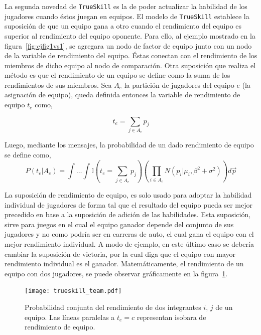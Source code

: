 \documentclass[11pt,twoside,spanish]{report} %
\begin{document}
La segunda novedad de \texttt{TrueSkill} es la de poder actualizar la habilidad de los jugadores cuando \'estos juegan en equipos.
El modelo de \texttt{TrueSkill} establece la suposici\'on de que un equipo gana a otro cuando el rendimiento del equipo es superior al rendimiento del equipo oponente.
Para ello, al ejemplo mostrado en la figura~\ref{fig:ejfig1vs1}, se agregara un nodo de factor de equipo junto con un nodo de la variable de rendimiento del equipo.
\'Estas conectan con el rendimiento de los miembros de dicho equipo al nodo de comparaci\'on.
Otra suposici\'on que realiza el m\'etodo es que el rendimiento de un equipo se define como la suma de los rendimientos de sus miembros.
Sea $A_e$ la partici\'on de jugadores del equipo $e$ (la asignaci\'on de equipo), queda definida entonces la variable de rendimiento de equipo $t_e$ como,

\begin{equation}
t_e = \sum_{j\in A_e } p_j
\end{equation}

Luego, mediante los mensajes, la probabilidad de un dado rendimiento de equipo se define como,
\begin{equation}
P(t_e|A_e) = \int \dots \int \mathbb{I}(t_e = \sum_{j\in A_e } p_j ) \left(\prod_{i \in A_e} N(p_i|\mu_i,\beta^2 + \sigma^2) \right) d\vec{p}
\end{equation}

La suposici\'on de rendimiento de equipo, es solo usado para adoptar la habilidad individual de jugadores de forma tal que el resultado del equipo pueda ser mejor precedido en base a la suposici\'on de adici\'on de las habilidades.
Esta suposici\'on, sirve para juegos en el cual el equipo ganador depende del conjunto de sus jugadores y no como podr\'ia ser en carreras de auto, el cual gana el equipo con el mejor rendimiento individual.
A modo de ejemplo, en este \'ultimo caso se deber\'ia cambiar la suposici\'on de victoria, por la cual diga que el equipo con mayor rendimiento individual es el ganador.
Matem\'aticamente, el rendimiento de un equipo con dos jugadores, se puede observar gr\'aficamente en la figura~\ref{fig:fig9}.

\begin{figure}[H]
	\centering
	\texttt{[image: trueskill\_team.pdf]}
	\caption{Probabilidad conjunta del rendimiento de dos integrantes $i$, $j$ de un equipo. Las l\'ineas paralelas a $t_e=c$ representan isobara de rendimiento de equipo.}
	\label{fig:fig9}
\end{figure}
\end{document}
